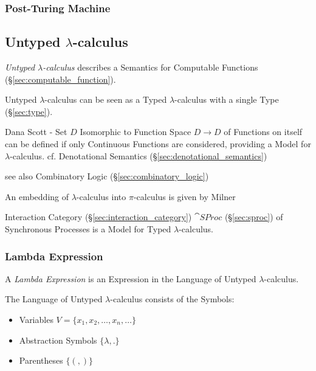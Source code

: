 \subsubsection{Post-Turing Machine}\label{sec:post_turing}



\subsection{Untyped $\lambda$-calculus}\label{sec:untyped_lambda}

\emph{Untyped $\lambda$-calculus} describes a Semantics for Computable
Functions (\S\ref{sec:computable_function}).

Untyped $\lambda$-calculus can be seen as a Typed $\lambda$-calculus
with a single Type (\S\ref{sec:type}).

Dana Scott - Set $D$ Isomorphic to Function Space $D \rightarrow D$ of
Functions on itself can be defined if only Continuous Functions are
considered, providing a Model for $\lambda$-calculus. cf. Denotational
Semantics (\S\ref{sec:denotational_semantics})

\fist see also Combinatory Logic (\S\ref{sec:combinatory_logic})

\fist An embedding of $\lambda$-calculus into $\pi$-calculus is given
by Milner \cite{milner90}

Interaction Category (\S\ref{sec:interaction_category}) $\cat{SProc}$
(\S\ref{sec:sproc}) of Synchronous Processes is a Model for Typed
$\lambda$-calculus.



\subsubsection{Lambda Expression}\label{sec:lambda_expression}

A \emph{Lambda Expression} is an Expression in the Language of Untyped
$\lambda$-calculus.

The Language of Untyped $\lambda$-calculus consists of the Symbols:
\begin{itemize}
  \item Variables $V = \{ x_1, x_2, \ldots, x_n, \ldots \}$
  \item Abstraction Symbols $\{ \lambda, . \}$
  \item Parentheses $\{ (, ) \}$
\end{itemize}

